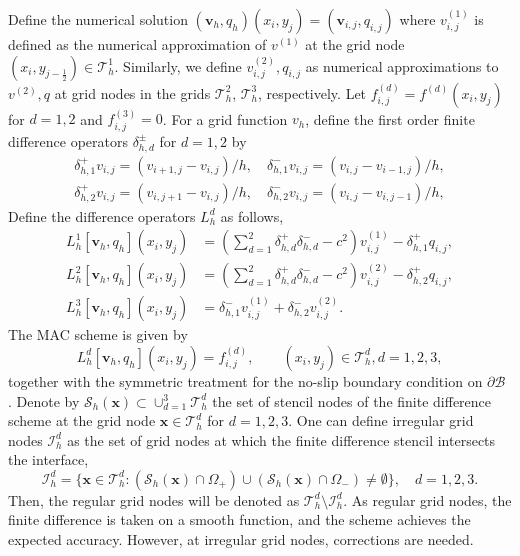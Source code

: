 \documentclass[preprint,11pt]{elsarticle}
\theoremstyle{remark}
\newcommand{\mc}[1]{\mathcal{#1}}
\newcommand{\bm}[1]{\boldsymbol{#1}}
\begin{document}
Define the numerical solution $(\bm v_h, q_h)(x_i,y_j) = (\bm v_{i,j}, q_{i,j})$ where $v^{(1)}_{i,j}$ is defined as the numerical approximation of $v^{(1)}$ at the grid node $(x_i, y_{j-\frac{1}{2}})\in\mathcal{T}^1_h$. 
Similarly, we define $v^{(2)}_{i,j}, q_{i,j}$ as numerical approximations to $v^{(2)}, q$ at grid nodes in the grids $\mathcal{T}^2_h$, $\mathcal{T}^3_h$, respectively.
Let $f_{i,j}^{(d)} = f^{(d)}(x_i, y_j)$ for $d=1,2$ and $f_{i, j}^{(3)} = 0$.
For a grid function $v_{h}$, define the first order finite difference operators $\delta_{h,d}^\pm$ for $d=1,2$ by 
\begin{equation}
\begin{aligned}
    \delta_{h,1}^+ v_{i,j} = (v_{i+1,j}-v_{i,j})/h, \quad \delta_{h,1}^- v_{i,j} = (v_{i,j}-v_{i-1,j})/h, \\
    \delta_{h,2}^+ v_{i,j} = (v_{i,j+1}-v_{i,j})/h, \quad \delta_{h,2}^- v_{i,j} = (v_{i,j}-v_{i,j-1})/h,
\end{aligned}
\end{equation}
Define the difference operators $L_h^d$ as follows,
\begin{align}
    L_h^1[\bm v_h, q_h](x_i,y_j) &= \left( \sum_{d=1}^2 \delta_{h,d}^+ \delta_{h,d}^- - c^2 \right) v^{(1)}_{i,j} - \delta_{h,1}^+ q_{i,j}, \\
    L_h^2[\bm v_h, q_h](x_i,y_j) &= \left( \sum_{d=1}^2 \delta_{h,d}^+ \delta_{h,d}^- - c^2 \right) v^{(2)}_{i,j} - \delta_{h,2}^+ q_{i,j}, \\
    L_h^3[\bm v_h, q_h](x_i,y_j) &= \delta_{h,1}^- v^{(1)}_{i,j} + \delta_{h,2}^- v^{(2)}_{i,j}.
\end{align}
The MAC scheme is given by
\begin{equation}
    L_h^d[\bm v_h, q_h](x_i,y_j) = f_{i,j}^{(d)}, \quad \quad  (x_i,y_j)\in \mc T_h^d, d= 1,2,3,
\end{equation}
together with the symmetric treatment for the no-slip boundary condition on $\partial\mathcal{B}$ .
Denote by $\mc S_h(\bm x)\subset \cup_{d=1}^3 \mc T_h^d$ the set of stencil nodes of the finite difference scheme at the grid node $\bm x \in \mc T_h^d$ for $d=1,2,3$.
One can define irregular grid nodes $\mc I_h^d$ as the set of grid nodes at which the finite difference stencil intersects the interface,
\begin{equation}
    \mc I_h^d = \{\bm x \in \mc T_h^d: (\mc S_h(\bm x)\cap \Omega_+)\cup (\mc S_h(\bm x)\cap \Omega_-) \neq \emptyset\}, \quad d=1,2,3.
\end{equation}
Then, the regular grid nodes will be denoted as $\mc T_h^d\setminus\mc I_h^d$.
As regular grid nodes, the finite difference is taken on a smooth function, and the scheme achieves the expected accuracy. However, at irregular grid nodes, corrections are needed.
\end{document}
